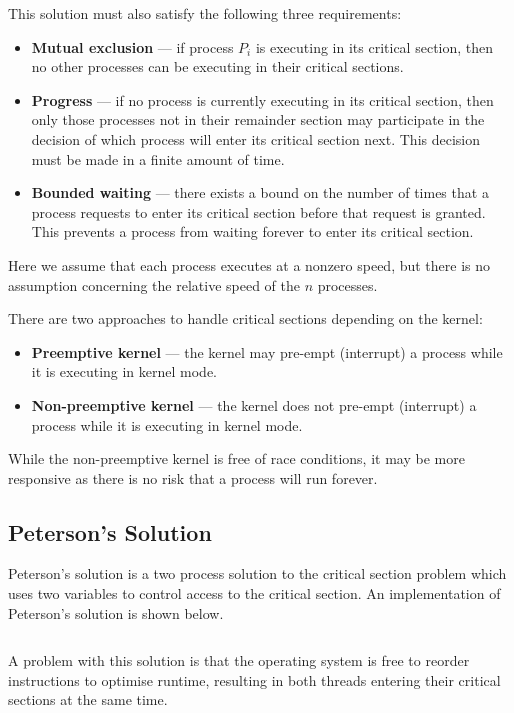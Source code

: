 \documentclass{article}
\begin{document}
This solution must also satisfy the following three requirements:
\begin{itemize}
    \item \textbf{Mutual exclusion} --- if process \(P_i\) is executing
          in its critical section, then no other processes can be
          executing in their critical sections.
    \item \textbf{Progress} --- if no process is currently executing in
          its critical section, then only those processes not in their
          remainder section may participate in the decision of which
          process will enter its critical section next. This decision must
          be made in a finite amount of time.
    \item \textbf{Bounded waiting} --- there exists a bound on the
          number of times that a process requests to enter its critical
          section before that request is granted. This prevents a
          process from waiting forever to enter its critical section.
\end{itemize}
Here we assume that each process executes at a nonzero speed, but there
is no assumption concerning the relative speed of the \(n\) processes.

There are two approaches to handle critical sections depending on the
kernel:
\begin{itemize}
    \item \textbf{Preemptive kernel} --- the kernel may pre-empt
          (interrupt) a process while it is executing in kernel mode.
    \item \textbf{Non-preemptive kernel} --- the kernel does not
          pre-empt (interrupt) a process while it is executing in
          kernel mode.
\end{itemize}
While the non-preemptive kernel is free of race conditions, it may be
more responsive as there is no risk that a process will run forever.
\subsection{Peterson's Solution}
Peterson's solution is a two process solution to the critical section
problem which uses two variables to control access to the critical
section. An implementation of Peterson's solution is shown below.

\inputminted{c}{code/petersons_solution.c}

A problem with this solution is that the operating system is free to
reorder instructions to optimise runtime, resulting in both threads
entering their critical sections at the same time.
\end{document}
